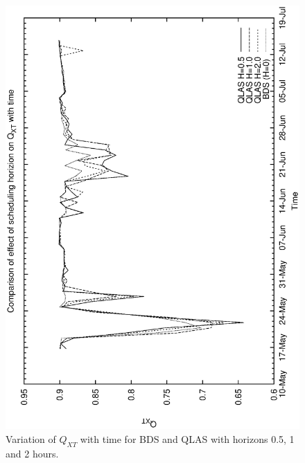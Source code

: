 \begin{figure}[htp]
\begin{center}
  \includegraphics[scale=0.5, angle=-90]{figures/qsa3_xt.eps}
  \caption[Variation of $Q_{XT}$ with time for QLAS horizons.]
  {Variation of $Q_{XT}$ with time for BDS and QLAS with horizons 0.5, 1 and 2 hours.}
\label{fig:ensemble_qlas_xt}
\end{center}
\end{figure}

